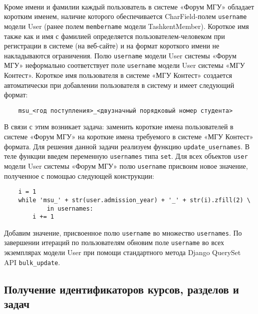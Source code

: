 \documentclass[12pt, a4paper, oneside]{article}
\begin{document}
\paragraph{}
Кроме имени и фамилии каждый пользователь в системе «Форум МГУ» обладает коротким именем, наличие которого обеспечивается CharField-полем \texttt{username} модели User (ранее полем \texttt{membername} модели TashkentMember). Короткое имя также как и имя с фамилией определяется пользователем-человеком при регистрации в системе (на веб-сайте) и на формат короткого имени не накладываются ограничения. Полю \texttt{username} модели User системы «Форум МГУ» неформально соответствует поле \texttt{username} модели User системы «МГУ Контест». Короткое имя пользователя в системе «МГУ Контест» создается автоматически при добавлении пользователя в систему и имеет следующий формат:
\begin{verbatim}
    msu_<год поступления>_<двузначный порядковый номер студента>
\end{verbatim}
В связи с этим возникает задача: заменить короткие имена пользователей в системе «Форум МГУ» на короткие имена требуемого в системе «МГУ Контест» формата. Для решения данной задачи реализуем функцию \texttt{update\_usernames}. В теле функции введем переменную \texttt{usernames} типа \texttt{set}. Для всех объектов \texttt{user} модели User системы «Форум МГУ» полю \texttt{username} присвоим новое значение, полученное с помощью следующей конструкции:
\begin{verbatim}
    i = 1
    while 'msu_' + str(user.admission_year) + '_' + str(i).zfill(2) \
            in usernames:
        i += 1
\end{verbatim}
Добавим значение, присвоенное полю \texttt{username} во множество \texttt{usernames}. По завершении итераций по пользователям обновим поле \texttt{username} во всех экземплярах модели User при помощи стандартного метода Django QuerySet API \texttt{bulk\_update}.
\vspace{1cm}

\subsection{Получение идентификаторов курсов, разделов и задач}
\end{document}
